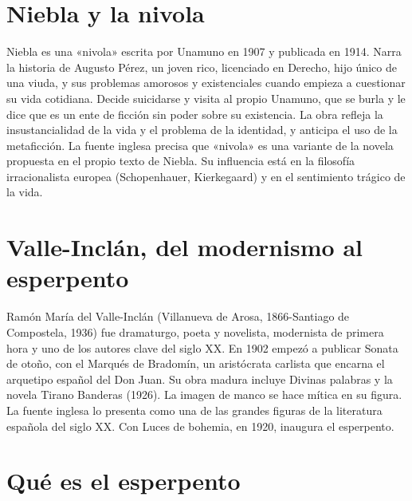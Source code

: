 \documentclass{book}
\begin{document}

\section{Niebla y la nivola}

Niebla es una «nivola» escrita por Unamuno en 1907 y publicada en 1914. Narra la historia de Augusto Pérez, un joven rico, licenciado en Derecho, hijo único de una viuda, y sus problemas amorosos y existenciales cuando empieza a cuestionar su vida cotidiana. Decide suicidarse y visita al propio Unamuno, que se burla y le dice que es un ente de ficción sin poder sobre su existencia. La obra refleja la insustancialidad de la vida y el problema de la identidad, y anticipa el uso de la metaficción. La fuente inglesa precisa que «nivola» es una variante de la novela propuesta en el propio texto de Niebla. Su influencia está en la filosofía irracionalista europea (Schopenhauer, Kierkegaard) y en el sentimiento trágico de la vida.


\section{Valle-Inclán, del modernismo al esperpento}

Ramón María del Valle-Inclán (Villanueva de Arosa, 1866-Santiago de Compostela, 1936) fue dramaturgo, poeta y novelista, modernista de primera hora y uno de los autores clave del siglo XX. En 1902 empezó a publicar Sonata de otoño, con el Marqués de Bradomín, un aristócrata carlista que encarna el arquetipo español del Don Juan. Su obra madura incluye Divinas palabras y la novela Tirano Banderas (1926). La imagen de manco se hace mítica en su figura. La fuente inglesa lo presenta como una de las grandes figuras de la literatura española del siglo XX. Con Luces de bohemia, en 1920, inaugura el esperpento.


\section{Qué es el esperpento}
\end{document}
